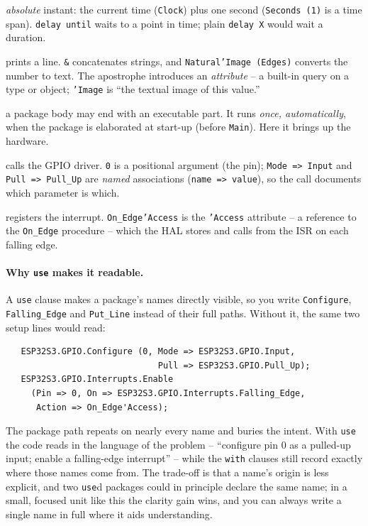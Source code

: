 \begin{description}[style=nextline]
  \emph{absolute} instant: the current time (\texttt{Clock}) plus one second
  (\texttt{Seconds (1)} is a time span). \texttt{delay until} waits to a point in
  time; plain \texttt{delay X} would wait a duration.
\item[\texttt{Put\_Line ("\ldots" \& Natural'Image (Edges));}] prints a line.
  \texttt{\&} concatenates strings, and \texttt{Natural'Image (Edges)} converts
  the number to text. The apostrophe introduces an \emph{attribute} -- a built-in
  query on a type or object; \texttt{'Image} is ``the textual image of this
  value.''
\item[\texttt{begin \ldots\ end Edge\_Demo;}] a package body may end with an
  executable part. It runs \emph{once, automatically}, when the package is
  elaborated at start-up (before \texttt{Main}). Here it brings up the hardware.
\item[\texttt{Configure (0, Mode => Input, Pull => Pull\_Up);}] calls the GPIO
  driver. \texttt{0} is a positional argument (the pin); \texttt{Mode => Input}
  and \texttt{Pull => Pull\_Up} are \emph{named} associations
  (\texttt{name => value}), so the call documents which parameter is which.
\item[\texttt{Enable (\ldots, Action => On\_Edge'Access);}] registers the
  interrupt. \texttt{On\_Edge'Access} is the \texttt{'Access} attribute -- a
  reference to the \texttt{On\_Edge} procedure -- which the HAL stores and calls
  from the ISR on each falling edge.
\end{description}

\paragraph{Why \texttt{use} makes it readable.} A \texttt{use} clause makes a
package's names directly visible, so you write \texttt{Configure},
\texttt{Falling\_Edge} and \texttt{Put\_Line} instead of their full paths. Without
it, the same two setup lines would read:

\begin{lstlisting}
   ESP32S3.GPIO.Configure (0, Mode => ESP32S3.GPIO.Input,
                              Pull => ESP32S3.GPIO.Pull_Up);
   ESP32S3.GPIO.Interrupts.Enable
     (Pin => 0, On => ESP32S3.GPIO.Interrupts.Falling_Edge,
      Action => On_Edge'Access);
\end{lstlisting}

The package path repeats on nearly every name and buries the intent. With
\texttt{use} the code reads in the language of the problem -- ``configure pin 0
as a pulled-up input; enable a falling-edge interrupt'' -- while the \texttt{with}
clauses still record exactly where those names come from. The trade-off is that a
name's origin is less explicit, and two \texttt{use}d packages could in principle
declare the same name; in a small, focused unit like this the clarity gain wins,
and you can always write a single name in full where it aids understanding.


